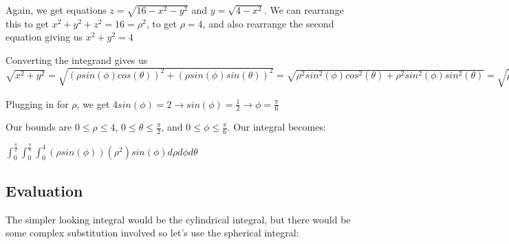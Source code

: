\documentclass{article}
\begin{document}
\par\noindent\large Again, we get equations $z = \sqrt{16 - x^{2} - y^{2}}$ and $y = \sqrt{4 - x^{2}}$.  We can rearrange this to get $x^{2} + y^{2} + z^{2} = 16 = \rho^{2}$, to get $\rho = 4$, and also rearrange the second equation giving us $x^{2} + y^{2} = 4$
\par\noindent\large Converting the integrand gives us $\sqrt{x^{2} + y^{2}} = \sqrt{(\rho sin(\phi)cos(\theta))^{2} + (\rho sin(\phi)sin(\theta))^{2}} = \sqrt{\rho^{2}sin^{2}(\phi)cos^{2}(\theta) + \rho^{2}sin^{2}(\phi)sin^{2}(\theta)} = \sqrt{\rho^{2}sin^{2}(\phi)[cos^{2}(\theta) + sin^{2}(\theta)]} = \rho sin(\phi) = \sqrt{4} = 2$
\par\noindent\large Plugging in for $\rho$, we get $4sin(\phi) = 2 \rightarrow sin(\phi) = \frac{1}{2} \rightarrow \phi = \frac{\pi}{6}$\vspace{0.25cm}

\par\noindent\large Our bounds are $0 \leq \rho \leq 4$, $0 \leq \theta \leq \frac{\pi}{2}$, and $0 \leq \phi \leq \frac{\pi}{6}$.  Our integral becomes:

\par\noindent\Large $\int_{0}^{\frac{\pi}{2}}\int_{0}^{\frac{\pi}{6}}\int_{0}^{4}(\rho sin(\phi))(\rho^{2})sin(\phi)d\rho d\phi d\theta$\vspace{0.25cm} 

\subsection{Evaluation}
\par\noindent\large The simpler looking integral would be the cylindrical integral, but there would be some complex substitution involved so let's use the spherical integral:

\end{document}
